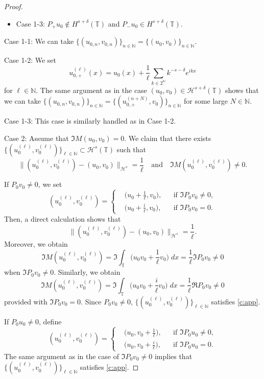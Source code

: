 \documentclass[10pt,a4paper]{amsart}
\renewcommand{\H}{\mathcal H}
\newcommand{\N}{\mathbb{N}}
\newcommand{\T}{\mathbb{T}}
\newcommand{\dl}{\delta}
\renewcommand{\l}{\ell}
\begin{document}
\begin{proof}
\begin{itemize}
\item
Case 1-3:
$P_+ u_0 \notin H^{s+\dl}(\T)$ and $P_- u_0 \in H^{s+\dl}(\T)$.
\end{itemize}

Case 1-1:
We can take $\{(u_{0,n}, v_{0,n})\}_{n \in \N} = \{(u_{0}, v_0)\}_{n \in \N}$.

Case 1-2:
We set
\[
u_{0, +}^{(\l)} (x) = u_0(x) + \frac 1\l \sum_{k \in 2^\N} k^{-s-\dl} e^{i k x}
\]
for $\l \in \N$.
The same argument as in the case $(u_0, v_0) \in \H^{s+\dl}(\T)$  shows that
we can take
$\{(u_{0,n}, v_{0,n})\}_{n \in \N} = \{(u_{0,+}^{(n+N)}, v_0)\}_{n \in \N}$ for some large $N \in \N$.

Case 1-3:
This case is similarly handled as in Case 1-2.

Case 2: Assume that $\Im M (u_0, v_0) = 0$.
We claim that there exists $\{(u_{0}^{(\l)}, v_{0}^{(\l)} ) \}_{\l \in \N} \subset \H^s(\T)$ such that
\begin{equation}
\| (u_0^{(\l)}, v_0^{(\l)}) - (u_{0}, v_{0}) \|_{\H^s} = \frac 1\l 
\quad \text {and} \quad \Im M (u_{0}^{(\l)}, v_{0}^{(\l)}) \neq 0.
\label{c:app}
\end{equation}

If $P_0 v_0 \neq 0$, we set
\[
(u_0^{(\l)}, v_0^{(\l)}) =
\left\{
\begin{aligned}
&\Big( u_0 + \frac 1\l, v_0 \Big), && \text {if $\Im P_0 v_0 \neq 0$}, \\
&\Big( u_0 + \frac i\l, v_0 \Big), && \text {if $\Im P_0 v_0 = 0$}.
\end{aligned}
\right.
\] 
Then, a direct calculation shows that
\[
\| (u_0^{(\l)}, v_0^{(\l)}) - (u_0 , v_0) \|_{\H^s} 
= \frac 1\l.
\]
Moreover, we obtain
\begin{equation*}
\Im M (u_0^{(\l)}, v_0^{(\l)})
=
\Im \int_\T \Big(u_0 v_0 + \frac 1\l v_0 \Big) \; dx 
= 
\frac 1\l \Im P_0 v_0
\neq 0
\end{equation*}
when $\Im P_0 v_0 \neq 0$.
Similarly, we obtain
\[
\Im M (u_0^{(\l)}, v_0^{(\l)})
=
\Im \int_\T \Big( u_0 v_0 + \frac i\l v_0 \Big) \; dx 
= 
\frac 1\l \Re P_0 v_0
\neq 0
\]
provided with $\Im P_0 v_0 = 0$.
Since $P_0 v_0 \neq 0$,
$\{(u_0^{(\l)}, v_0^{(\l)})\}_{\l \in \N}$ satisfies \eqref{c:app}.


If $P_0 u_0 \neq 0$, define
\[
(u_0^{(\l)}, v_0^{(\l)}) =
\left\{
\begin{aligned}
&\Big( u_0, v_0 + \frac 1\l \Big), && \text {if $\Im P_0 u_0 \neq 0$}, \\
&\Big( u_0, v_0 + \frac i\l \Big), && \text {if $\Im P_0 u_0 = 0$}.
\end{aligned}
\right.
\] 
The same argument as in the case of $\Im P_0 v_0 \neq 0$ implies that
$\{(u_0^{(\l)}, v_0^{(\l)})\}_{\l \in \N}$ satisfies \eqref{c:app}.


\end{proof}
\end{document}
